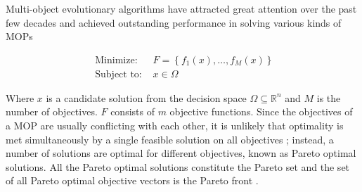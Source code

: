 \documentclass[journal]{IEEEtran}
\begin{document}
Multi-object evolutionary algorithms have attracted great attention over the past few decades and achieved outstanding performance in solving various kinds of MOPs \cite{fialho2010adaptive}







\begin{equation}
  \begin{array}{ll}
    \text { Minimize: }   & F=\left\{f_{1}(x), \ldots, f_{M}(x)\right\} \\
    \text { Subject to: } & x \in \Omega
  \end{array}
\end{equation}

Where $x$ is a candidate solution from the decision space $\Omega \subseteq \mathbb{R}^{n}$ and $M$ is the number of objectives. $F$ consists of $m$ objective functions. Since the objectives of a MOP are usually conflicting with each other, it is unlikely that optimality is met simultaneously by a single feasible solution on all objectives \cite{BAZGAN201341}; instead, a number of solutions are optimal for different objectives, known as Pareto optimal solutions. All the Pareto optimal solutions constitute the Pareto set and the set of all Pareto optimal objective vectors is the Pareto front \cite{deb2001multi}.
\end{document}
